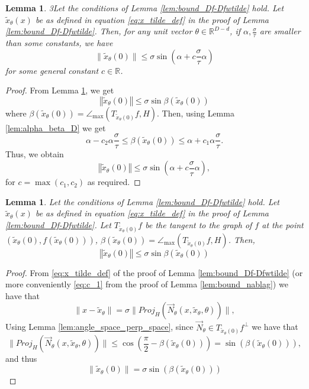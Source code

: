 \documentclass[12pt]{article}
\newtheorem{Lemma}[Theorem]{Lemma}
\theoremstyle{remark}
\newcommand{\RR}{\mathbb{R}}
\newcommand{\norm}[1]{\left\Vert #1 \right\Vert}
\newcommand{\wtilde}[1]{\widetilde{#1}}
\newcommand{\maxangle}{\angle_{\max}}
\begin{document}
\begin{appendices}
\begin{Lemma}\label{lem:wtilde_x_bound_clean_D}
3Let the conditions of Lemma \ref{lem:bound_Df-Dfwtilde} hold. Let $\wtilde x_\theta(x)$ be as defined in equation \eqref{eq:x_tilde_def} in the proof of Lemma \ref{lem:bound_Df-Dfwtilde}.
Then, for any unit vector $\theta\in \RR^{D-d}$, if $\alpha, \frac{\sigma}{\tau}$ are smaller than some constants, we have
	\begin{equation*}
	\|\wtilde{x}_\theta(0)\| \leq \sigma \sin (\alpha + c\frac{\sigma}{\tau}\alpha)
	\end{equation*}
 for some general constant $c\in\RR$.
\end{Lemma}
\begin{proof}
	From Lemma \ref{lem:x_tilde_bound_beta_D}, we get
	\begin{equation}\label{eq:xtilde_alpha_bound}
	\norm{\wtilde{x}_\theta(0)} \leq \sigma \sin \beta (\wtilde x_\theta(0)) 
	\end{equation}
	where $ \beta (\wtilde x_\theta(0)) = \maxangle(T_{\wtilde x_{\theta}(0)}f, H) $.
	Then, using Lemma \ref{lem:alpha_beta_D} we get
	\[
	\alpha - c_2\alpha \frac{\sigma}{\tau}  \leq \beta(\wtilde x_\theta(0)) \leq \alpha + c_1\alpha\frac{\sigma}{\tau}
	.\]
	Thus, we obtain
	\[
	\norm{\wtilde x_\theta(0)} \leq \sigma \sin (\alpha + c\frac{\sigma}{\tau}\alpha)
	,\]
 for $c=\max(c_1,c_2)$
	as required.
\end{proof}

\begin{Lemma}\label{lem:x_tilde_bound_beta_D}
Let the conditions of Lemma \ref{lem:bound_Df-Dfwtilde} hold. Let $\wtilde x_\theta(x)$ be as defined in equation \eqref{eq:x_tilde_def} in the proof of Lemma \ref{lem:bound_Df-Dfwtilde}.
Let $ T_{\wtilde x_\theta(0)}f $ be the tangent to the graph of $ f $ at the point $ (\wtilde x_\theta(0), f(\wtilde x_\theta(0))) $, $ \beta(\wtilde x_\theta(0)) =  \maxangle(T_{\wtilde x_\theta(0)}f, H)$.
	Then,
	\[
	\norm{\wtilde x_\theta(0) } \leq \sigma \sin \beta(\wtilde x_\theta(0))
	\]
\end{Lemma}
\begin{proof}
From \eqref{eq:x_tilde_def} of the proof of Lemma \ref{lem:bound_Df-Dfwtilde} (or more conveniently \eqref{eq:c_1} from the proof of Lemma \ref{lem:bound_nablag}) we have that 
\[
\|x-\wtilde{x}_\theta\| = \sigma \|Proj_H(\vec N_\theta(x,\wtilde{x}_\theta,\theta))\|,
\]
Using Lemma \ref{lem:angle_space_perp_space}, since $\vec N_\theta \in T_{\wtilde x_\theta(0)}f^\perp$ we have that 
\[
\|Proj_H(\vec N_\theta(x,\wtilde{x}_\theta,\theta))\| \leq \cos (\frac{\pi}{2}  - \beta(\wtilde x_\theta(0))) = \sin(\beta(\wtilde x_\theta(0))),
\]
and thus
\[
\|\wtilde{x}_\theta(0)\| = \sigma \sin(\beta(\wtilde x_\theta(0)))
\]
\end{proof}



\end{appendices}
\end{document}
